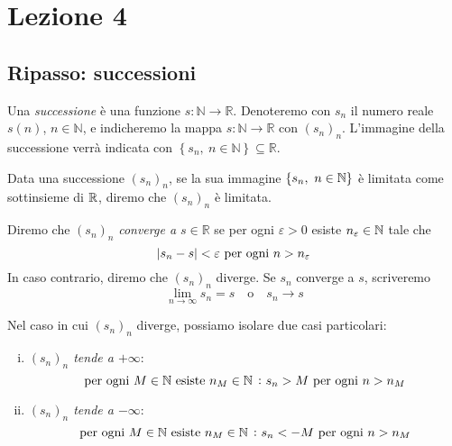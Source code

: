 \section{Lezione 4}
\subsection{Ripasso: successioni}
\begin{definition}
    \label{def:4.1}
    Una \emph{successione} è una funzione $s\colon \mathbb{N}\to\mathbb{R}$. Denoteremo con $s_n$ il numero reale $s(n)$, $n\in\mathbb{N}$, e indicheremo la mappa $s\colon \mathbb{N}\to \mathbb{R}$ con $(s_n)_n$. L'immagine della successione verrà indicata con $\left\{s_n, \ n\in\mathbb{N}\right\}\subseteq \mathbb{R}$.
\end{definition}
\begin{remark}
    Data una successione $(s_n)_n$, se la sua immagine $\{s_n, \ n\in\amsbb{N}\}$ è limitata come sottinsieme di $\amsbb{R}$, diremo che $(s_n)_n$ è limitata.
\end{remark}
\begin{definition}
    \label{def:4.2}
    Diremo che $(s_n)_n$ \emph{converge a $s\in\mathbb{R}$} se per ogni $\varepsilon>0$ esiste $n_\varepsilon\in\amsbb{N}$ tale che
    \[
    \abs{s_n-s}<\varepsilon \ \text{per ogni}\ n>n_\varepsilon
    \]
    In caso contrario, diremo che $(s_n)_n$ diverge. Se $s_n$ converge a $s$, scriveremo
    \[
    \lim_{n\to\infty} s_n = s \quad \text{o} \quad s_n \to s
    \]
\end{definition}
\begin{remark}
    Nel caso in cui $(s_n)_n$ diverge, possiamo isolare due casi particolari:
    \begin{enumerate}[(i)]
        \item \emph{$(s_n)_n$ tende a $+\infty$}:
        \begin{equation}
            \label{eq:4.1}
            \text{per ogni} \ M \in\amsbb{N} \ \text{esiste} \ n_M\in \amsbb{N} \ \colon s_n >M \ \text{per ogni} \ n>n_M
        \end{equation}
        \item \emph{$(s_n)_n$ tende a $-\infty$}:
        \begin{equation}
            \label{eq:4.2}
            \text{per ogni} \ M \in\amsbb{N} \ \text{esiste} \ n_M\in \amsbb{N} \ \colon s_n <-M \ \text{per ogni} \ n>n_M
        \end{equation}
    \end{enumerate}
\end{remark}
